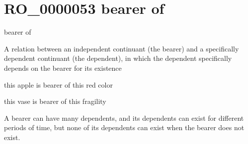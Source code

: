 \documentclass[letterpaper,10pt,english]{sphinxmanual}
\begin{document}
\section{RO\_0000053 \sphinxhyphen{} bearer of}
\label{\detokenize{doc-RO_0000053:ro-0000053-bearer-of}}\label{\detokenize{doc-RO_0000053:index-0}}\label{\detokenize{doc-RO_0000053::doc}}
\begin{sphinxShadowBox}

\sphinxAtStartPar
bearer of
\end{sphinxShadowBox}

\begin{sphinxShadowBox}

\sphinxAtStartPar
A relation between an independent continuant (the bearer) and a specifically dependent continuant (the dependent), in which the dependent specifically depends on the bearer for its existence
\end{sphinxShadowBox}

\begin{sphinxShadowBox}

\sphinxAtStartPar
this apple is bearer of this red color

\sphinxAtStartPar
this vase is bearer of this fragility
\end{sphinxShadowBox}

\begin{sphinxShadowBox}

\sphinxAtStartPar
A bearer can have many dependents, and its dependents can exist for different periods of time, but none of its dependents can exist when the bearer does not exist.
\end{sphinxShadowBox}

\begin{sphinxShadowBox}

\sphinxAtStartPar
{}
\end{sphinxShadowBox}
\begin{quote}
\label{\detokenize{doc-RO_0000056:ro-0000056}}\label{\detokenize{doc-RO_0000056:participates-in}}\label{\detokenize{doc-RO_0000056:ro-0000056}}
\ignorespaces \end{quote}
\end{document}
